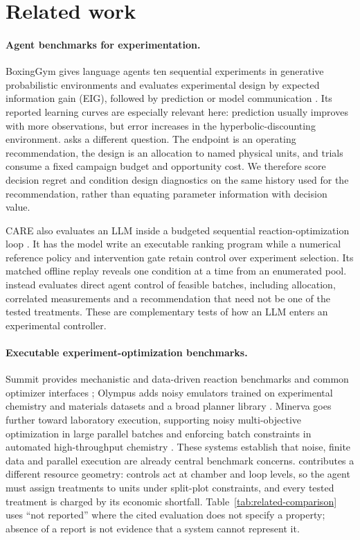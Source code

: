 \section{Related work}
\label{sec:related}

\paragraph{Agent benchmarks for experimentation.}
BoxingGym gives language agents ten sequential experiments in generative probabilistic
environments and evaluates experimental design by expected information gain (EIG), followed
by prediction or model communication \citep{boxinggym}. Its reported learning curves are
especially relevant here: prediction usually improves with more observations, but error
increases in the hyperbolic-discounting environment. \slowlab{} asks a different question.
The endpoint is an operating recommendation, the design is an allocation to named physical
units, and trials consume a fixed campaign budget and opportunity cost. We therefore score
decision regret and condition design diagnostics on the same history used for the
recommendation, rather than equating parameter information with decision value.

CARE also evaluates an LLM inside a budgeted sequential reaction-optimization loop
\citep{care2026}. It has the model write an executable ranking program while a numerical
reference policy and intervention gate retain control over experiment selection. Its matched
offline replay reveals one condition at a time from an enumerated pool. \slowlab{} instead
evaluates direct agent control of feasible batches, including allocation, correlated
measurements and a recommendation that need not be one of the tested treatments. These are
complementary tests of how an LLM enters an experimental controller.

\paragraph{Executable experiment-optimization benchmarks.}
Summit provides mechanistic and data-driven reaction benchmarks and common optimizer
interfaces \citep{summit}; Olympus adds noisy emulators trained on experimental chemistry
and materials datasets and a broad planner library \citep{olympus}. Minerva goes further
toward laboratory execution, supporting noisy multi-objective optimization in large
parallel batches and enforcing batch constraints in automated high-throughput chemistry
\citep{minerva}. These systems establish that noise, finite data and parallel execution are
already central benchmark concerns. \slowlab{} contributes a different resource geometry:
controls act at chamber and loop levels, so the agent must assign treatments to units under
split-plot constraints, and every tested treatment is charged by its economic shortfall.
Table~\ref{tab:related-comparison} uses ``not reported'' where the cited evaluation does not
specify a property; absence of a report is not evidence that a system cannot represent it.

